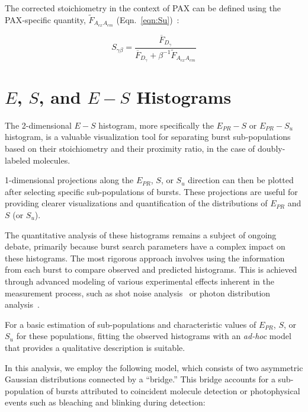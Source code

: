 The corrected stoichiometry in the context of \ac{PAX} can be defined using the \ac{PAX}-specific quantity, $\tilde{F}_{A_{ex}A_{em}}$ (Eqn.~\ref{eqn:Su})~\cite{ingargiola_JCP_2018}:

\begin{equation}
    \label{eqn:corr_Spax}
    S_{\gamma\beta} = \frac{\overline{F}_{D_{\gamma}}}{\overline{F}_{D_{\gamma}} + \beta^{-1}\tilde{F}_{A_{ex}A_{em}}}
\end{equation}


\section{$E$, $S$, and $E-S$ Histograms}
\label{sec:E_S_histogram}

The 2-dimensional $E - S$ histogram, more specifically the $E_{PR}-S$ or $E_{PR}-S_u$ histogram, is a valuable visualization tool for separating burst sub-populations based on their stoichiometry and their proximity ratio, in the case of doubly-labeled molecules. 

1-dimensional projections along the $E_{PR}$, $S$, or $S_u$ direction can then be plotted after selecting specific sub-populations of bursts. 
These projections are useful for providing clearer visualizations and quantification of the distributions of $E_{PR}$ and $S$ (or $S_u$).

The quantitative analysis of these histograms remains a subject of ongoing debate, primarily because burst search parameters have a complex impact on these histograms. 
The most rigorous approach involves using the information from each burst to compare observed and predicted histograms. 
This is achieved through advanced modeling of various experimental effects inherent in the measurement process, such as shot noise analysis~\cite{nir_JPCB_2006,ingargiola_PLOS1_2016} or photon distribution analysis~\cite{antonik_JPCB_2006}.

For a basic estimation of sub-populations and characteristic values of $E_{PR}$, $S$, or $S_u$ for these populations, fitting the observed histograms with an \textit{ad-hoc} model that provides a qualitative description is suitable.

In this analysis, we employ the following model, which consists of two asymmetric Gaussian distributions connected by a \enquote{bridge.} 
This bridge accounts for a sub-population of bursts attributed to coincident molecule detection or photophysical events such as bleaching and blinking during detection:

